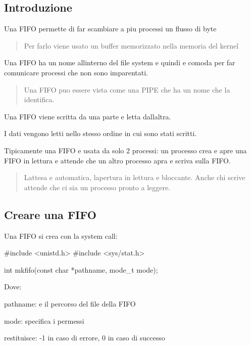 \subsection*{Introduzione}

Una F\+I\+FO permette di far scambiare a piu\textquotesingle{} processi un flusso di byte \begin{quote}
Per farlo viene usato un buffer memorizzato nella memoria del kernel \end{quote}


Una F\+I\+FO ha un nome all\textquotesingle{}interno del file system e quindi e\textquotesingle{} comoda per far comunicare processi che non sono imparentati. \begin{quote}
Una F\+I\+FO puo\textquotesingle{} essere vista come una P\+I\+PE che ha un nome che la identifica. \end{quote}


Una F\+I\+FO viene scritta da una parte e letta dall\textquotesingle{}altra.

I dati vengono letti nello stesso ordine in cui sono stati scritti.

Tipicamente una F\+I\+FO e\textquotesingle{} usata da solo 2 processi\+: un processo crea e apre una F\+I\+FO in lettura e attende che un altro processo apra e scriva sulla F\+I\+FO. \begin{quote}
L\textquotesingle{}attesa e\textquotesingle{} automatica, l\textquotesingle{}apertura in lettura e\textquotesingle{} bloccante. Anche chi scrive attende che ci sia un processo pronto a leggere. \end{quote}


\subsection*{Creare una F\+I\+FO}

Una F\+I\+FO si crea con la system call\+: 
\begin{DoxyCode}
\textcolor{preprocessor}{#include <unistd.h>}
\textcolor{preprocessor}{#include <sys/stat.h>}

\textcolor{keywordtype}{int} mkfifo(\textcolor{keyword}{const} \textcolor{keywordtype}{char} *pathname, mode\_t mode);
\end{DoxyCode}


Dove\+:
\begin{DoxyItemize}
\item pathname\+: e\textquotesingle{} il percorso del file della F\+I\+FO
\item mode\+: specifica i permessi
\item restituisce\+: -\/1 in caso di errore, 0 in caso di successo
\end{DoxyItemize}


